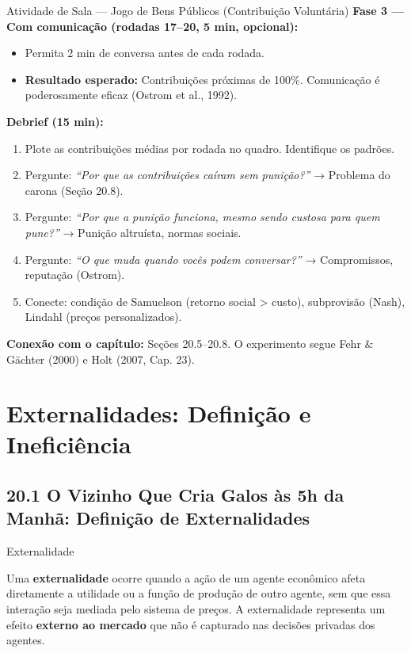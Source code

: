 \documentclass[11pt,twoside,openright]{book}
\providecommand{\tightlist}{\setlength{\itemsep}{0pt}\setlength{\parskip}{0pt}}
\begin{document}
\begin{classroombox}{Atividade de Sala — Jogo de Bens Públicos (Contribuição Voluntária)}
\textbf{Fase 3 --- Com comunicação (rodadas 17--20, 5 min, opcional):}

\begin{itemize}
\tightlist
\item
  Permita 2 min de conversa antes de cada rodada.
\item
  \textbf{Resultado esperado:} Contribuições próximas de 100\%.
  Comunicação é poderosamente eficaz (Ostrom et al., 1992).
\end{itemize}

\textbf{Debrief (15 min):}

\begin{enumerate}
\def\labelenumi{\arabic{enumi}.}
\tightlist
\item
  Plote as contribuições médias por rodada no quadro. Identifique os
  padrões.
\item
  Pergunte: \emph{``Por que as contribuições caíram sem punição?''} →
  Problema do carona (Seção 20.8).
\item
  Pergunte: \emph{``Por que a punição funciona, mesmo sendo custosa para
  quem pune?''} → Punição altruísta, normas sociais.
\item
  Pergunte: \emph{``O que muda quando vocês podem conversar?''} →
  Compromissos, reputação (Ostrom).
\item
  Conecte: condição de Samuelson (retorno social \textgreater{} custo),
  subprovisão (Nash), Lindahl (preços personalizados).
\end{enumerate}

\textbf{Conexão com o capítulo:} Seções 20.5--20.8. O experimento segue
Fehr \& Gächter (2000) e Holt (2007, Cap. 23).

\end{classroombox}

\chapter{Externalidades: Definição e
Ineficiência}\label{externalidades-definiuxe7uxe3o-e-ineficiuxeancia}

\section{20.1 O Vizinho Que Cria Galos às 5h da Manhã: Definição de
Externalidades}\label{201}

\begin{definitionbox}{Externalidade}

Uma \textbf{externalidade} ocorre quando a ação de um agente econômico
afeta diretamente a utilidade ou a função de produção de outro agente,
sem que essa interação seja mediada pelo sistema de preços. A
externalidade representa um efeito \textbf{externo ao mercado} que não é
capturado nas decisões privadas dos agentes.

\end{definitionbox}
\end{document}
